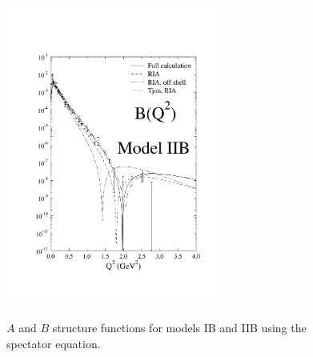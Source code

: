 \documentclass[mythesis.tex]{subfiles}
\begin{document}
\begin{figure}
{     \includegraphics[width=2.75in]{graphics/b_iib.pdf}}
  \caption{$A$ and $B$ structure functions for models IB and IIB using the
           spectator equation.}\label{structure}
\end{figure}
\end{document}
